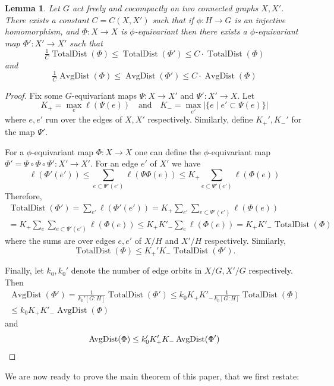 \documentclass{amsart}
\numberwithin{equation}{section}
\newtheorem{lemma}[theorem]{Lemma}
\theoremstyle{definition}
\DeclareMathOperator{\AD}{AvgDist}
\DeclareMathOperator{\TD}{TotalDist}
\begin{document}
\begin{lemma}\label{all graphs are equivalent}
Let $G$ act freely and cocompactly on two connected graphs $X,X'$. There exists a constant $C=C(X,X')$ such that if $\phi:H\to G$ is an injective homomorphism, and $\Phi:X\to X$ is $\phi$-equivariant then there exists a $\phi$-equivariant map $\Phi':X'\to X'$ such that 
$$\tfrac 1C\TD(\Phi)\le \TD(\Phi')\le C\cdot \TD(\Phi)$$
and 
$$\tfrac 1C\AD(\Phi)\le \AD(\Phi')\le C\cdot \AD(\Phi)$$
\end{lemma}
\begin{proof}
        Fix some $G$-equivariant maps $\Psi :X\to X'$ and $ \Psi':X'\to X$. Let $$K_+=\max_{e}\ell(\Psi(e)) \quad \text{and}\quad  K_-=\max _{e'} |\{e\;|\;e'\subset\Psi(e)\}|$$ where $e,e'$ run over the edges of $X,X'$ respectively. 
        Similarly, define $K_+',K_-'$ for the map $\Psi'$.
        
        For a $\phi$-equivariant map $\Phi:X\to X$ one can define the $\phi$-equivariant map $\Phi'=\Psi\circ \Phi \circ \Psi':X'\to X'$.
        For an edge $e'$ of $X'$  we have 
        $$\ell(\Phi'(e'))\le \sum _{e\subset \Psi'(e')}\ell(\Psi\Phi(e))\le K_+ \sum _{e\subset \Psi'(e')}\ell(\Phi(e))$$
        Therefore, 
        \begin{multline*}
            \TD(\Phi')= \sum_{e'}\ell(\Phi'(e'))=K_+\sum_{e'}\sum_{e\subset \Psi'(e')}\ell(\Phi(e))\\
            =K_+\sum_{e}\sum_{e\subset \Psi'(e')}\ell(\Phi(e))\le K_+K'_-\sum_e\ell(\Phi(e)) = K_+K'_- \TD(\Phi)
        \end{multline*}
        where the sums are over edges $e,e'$ of $X/H$ and $X'/H$ respectively.
        Similarly, $$\TD(\Phi)\le K_+'K_-\TD(\Phi').$$
        

        Finally, let $k_0,k_0'$ denote the number of edge orbits in $X/G,X'/G$ respectively. Then \begin{multline*}
        \AD(\Phi') = \tfrac{1}{k_0'[G:H]}\TD(\Phi')
        \le k_0K_+K'_-\tfrac1{k_0[G:H]}\TD(\Phi)\\
        \le k_0K_+K'_-\AD(\Phi)\end{multline*}
        and 
        $$\AD(\Phi) \le k_0'K_+'K_-\AD(\Phi')\qedhere$$ 
\end{proof}
We are now ready to prove the main theorem of this paper, that we first restate:
\maintheorem*
\end{document}
